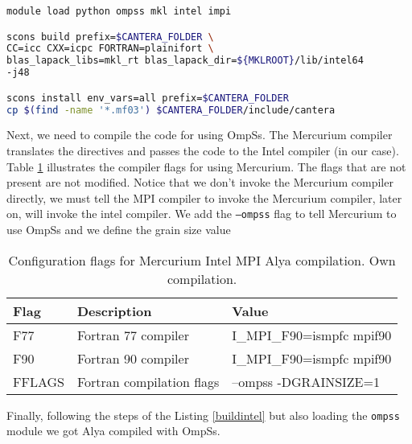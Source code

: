 \begin{lstlisting}[language=sh, caption={Cantera Mercurium build.}, label={canterabuild}]
module load python ompss mkl intel impi

scons build prefix=$CANTERA_FOLDER \
CC=icc CXX=icpc FORTRAN=plainifort \
blas_lapack_libs=mkl_rt blas_lapack_dir=${MKLROOT}/lib/intel64 
-j48

scons install env_vars=all prefix=$CANTERA_FOLDER
cp $(find -name '*.mf03') $CANTERA_FOLDER/include/cantera
\end{lstlisting}


Next, we need to compile the code for using OmpSs. The Mercurium compiler translates the directives and passes the code to the Intel compiler (in our case). Table \ref{flagsompss} illustrates the compiler flags for using Mercurium. The flags that are not present are not modified. Notice that we don't invoke the Mercurium compiler directly, we must tell the MPI compiler to invoke the Mercurium compiler, later on, will invoke the intel compiler. We add the \texttt{--ompss} flag to tell Mercurium to use OmpSs and we define the grain size value 

\begin{table}[htbp]
\centering
\begin{tabular}{l|l|l} 
\toprule
\textbf{Flag}     & \textbf{Description}         & \textbf{Value}                                                                       \\ 
\hline
F77      & Fortran 77 compiler & I\_MPI\_F90=ismpfc mpif90                                                                      \\ 
\hline
F90      & Fortran 90 compiler & I\_MPI\_F90=ismpfc mpif90                                                                      \\ 
\hline
FFLAGS      & Fortran compilation flags & --ompss -DGRAINSIZE=1                                                                     \\ 
\bottomrule
\end{tabular}
\caption[Configuration flags for Mercurium Intel MPI Alya compilation.]{Configuration flags for Mercurium Intel MPI Alya compilation. Own compilation.}
\label{flagsompss}
\end{table}

Finally, following the steps of the Listing \ref{buildintel} but also loading the \texttt{ompss} module we got Alya compiled with OmpSs.

